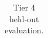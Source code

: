 \begin{table}[htbp]
\centering
\caption{Tier 4 held-out evaluation.}
\label{tab:tier4_holdout}
\begin{tabular}{l}
\toprule
 \\
\midrule
\bottomrule
\end{tabular}
\end{table}
